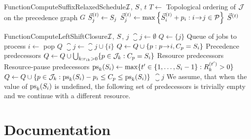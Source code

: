 \begin{alg}{Function}{ComputeSuffixRelaxedSchedule}{$\mathcal{I}$, $S$, $t$} \label{alg:suffix-relaxed-schedule}
\State $T \gets $ Topological ordering of $\mathcal{J}$ on the precedence graph $G$
        \State $\vec{S}^{(t)}_{j} \gets S_{j}$
    \Else
        \State $\vec{S}^{(t)}_{j} \gets \max\left\{\vec{S}^{(t)}_{i} + p_{i} : i \hspace{-0.2em} \rightarrow \hspace{-0.2em} j \in \mathcal{P} \right\}$
    \EndIf
\EndFor
\State \Return $\vec{S}^{(t)}$
\end{alg}

\newpage
\begin{alg}{Function}{ComputeLeftShiftClosure}{$\mathcal{I}$, $S$, $j$} \label{alg:left-shift-closure}
\State $\closure{j} \gets \emptyset$
\State $Q \gets \{j\}$ \Comment Queue of jobs to process
    \State $i \gets$ pop $Q$
    \State $\closure{j} \gets \closure{j} \cup \{ i \}$
    \State $Q \gets Q \cup \{ p : p \hspace{-0.2em} \rightarrow \hspace{-0.2em} i, C_{p} = S_{i}\}$
        \Comment Precedence predecessors
    \State $Q \gets Q \cup \bigcup_{k: r_{i k} > 0}\{ p \in \mathcal{J}_{k} : C_{p} = S_{i} \}$
        \Comment Resource predecessors
        \Comment Resource-pause predecessors
        \State $\mathrm{ps}_k(\jobstart{i}) \gets \max\{t^\prime \in \intinterval{1}{\jobstart{i}-1} : \capacity{k}{t^\prime} > 0\}$
        \State $Q \gets Q \cup \{ p \in \mathcal{J}_{k} : \mathrm{ps}_k(S_{i}) - p_{i} \leq C_{p} \leq \mathrm{ps}_k(S_{i}) \}$
    \EndFor
\EndWhile
\State \Return $\closure{j}$
\Statex
\Note  We assume, that when the value of $\mathrm{ps}_k(S_{i})$ is undefined,
       the following set of predecessors
\Notec is trivially empty and we continue with a different resource.
\end{alg}

\section{Documentation} \label{sec:attachments/documentation}


